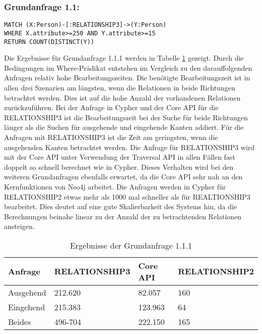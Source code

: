 \subsubsection{Grundanfrage 1.1:}
\begin{Verbatim}[frame=single]
MATCH (X:Person)-[:RELATIONSHIP3]->(Y:Person) 
WHERE X.attribute>=250 AND Y.attribute>=15  
RETURN COUNT(DISTINCT(Y))
\end{Verbatim} 
Die Ergebnisse für Grundanfrage 1.1.1  werden  in Tabelle \ref{tab:Query1_1} gezeigt.
 Durch die Bedingungen im Where-Prädikat entstehen im Vergleich zu den darauffolgenden Anfragen relativ hohe Bearbeitungszeiten. Die benötigte Bearbeitungszeit ist in allen drei Szenarien am längsten, wenn die Relationen in beide Richtungen betrachtet werden. Dies ist auf die hohe Anzahl der vorhandenen Relationen zurückzuführen. Bei der Anfrage in Cypher und der Core API für die RELATIONSHIP3  ist die Bearbeitungszeit bei der Suche für beide Richtungen länger als die Suchen für ausgehende und eingehende Kanten addiert. Für die Anfragen mit RELATIONSHIP3 ist die Zeit am geringsten, wenn die ausgehenden Kanten betrachtet werden. \newline
Die Anfrage für RELATIONSHIP3 wird mit der Core API unter Verwendung der Traversal API in  allen Fällen fast doppelt so schnell berechnet wie in Cypher. Dieses Verhalten wird bei den weiteren Grundanfragen ebenfalls erwartet, da die Core API sehr nah an den Kernfunktionen von Neo4j arbeitet. \newline
Die Anfragen werden in Cypher für RELATIONSHIP2 etwas mehr als 1000 mal schneller als für REALTIONSHIP3 bearbeitet. Dies deutet auf eine gute Skalierbarkeit des Systems hin, da die Berechnungen beinahe linear zu der Anzahl der zu betrachtenden Relationen ansteigen. 
\FloatBarrier  
\begin{table}[h]
\centering
\begin{tabular}{ |p{3cm}||p{3cm}|p{3cm}|p{3cm}|  }
	\hline
	Anfrage& RELATIONSHIP3 &Core API&RELATIONSHIP2\\
	\hline
	Ausgehend	& 212.620  & 82.057   & 160\\
	Eingehend   & 215.383    &123.963&  64\\
	Beides&496-704 & 222.150&  165\\
	\hline
\end{tabular}
\caption{Ergebnisse der Grundanfrage 1.1.1}
\label{tab:Query1_1}
\end{table}
\FloatBarrier
